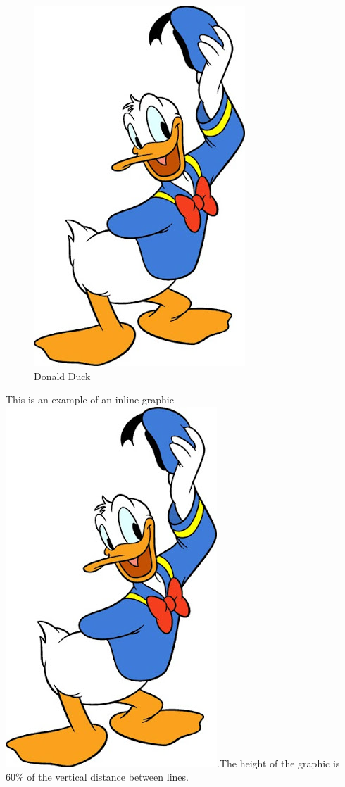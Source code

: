 \documentclass[12pt]{article}
\begin{document}
\blindtext
\begin{figure}[h]
	\begin{center}
	\includegraphics{Donald.png}
	\end{center}
\caption{Donald Duck}
\end{figure}
\blindtext

This is an example of an inline graphic \includegraphics[height=0.6\baselineskip]{Donald.png}.The height of the graphic is 60\% of the vertical distance between lines.
\end{document}
